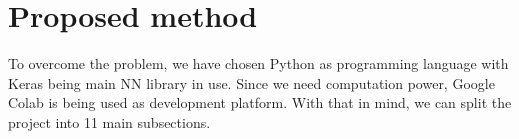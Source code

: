 \section{Proposed method}
To overcome the problem, we have chosen Python as programming language with Keras \parencite{web:AboutKeras} being main NN library in use. Since we need computation power, Google Colab \parencite{web:AboutGoogleColab} is being used as development platform. With that in mind, we can split the project into 11 main subsections.





















